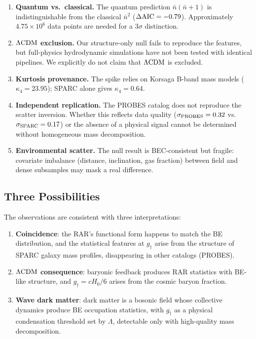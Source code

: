 \documentclass[twocolumn,twocolappendix]{aastex631}
\newcommand{\gdag}{g_{\dagger}}
\newcommand{\nbar}{\bar{n}}
\newcommand{\lcdm}{\Lambda{\rm CDM}}
\newcommand{\daic}{\Delta{\rm AIC}}
\begin{document}
\begin{enumerate}
    \item \textbf{Quantum vs.\ classical.} The quantum prediction
    $\nbar(\nbar+1)$ is indistinguishable from the classical $\nbar^2$
    ($\daic = -0.79$). Approximately $4.75 \times 10^6$ data points are
    needed for a $3\sigma$ distinction.
    \item \textbf{$\lcdm$ exclusion.} Our structure-only null fails to
    reproduce the features, but full-physics hydrodynamic simulations have
    not been tested with identical pipelines. We explicitly do not claim
    that $\lcdm$ is excluded.
    \item \textbf{Kurtosis provenance.} The spike relies on Korsaga B-band
    mass models ($\kappa_4 = 23.95$); SPARC alone gives $\kappa_4 = 0.64$.
    \item \textbf{Independent replication.} The PROBES catalog does not
    reproduce the scatter inversion. Whether this reflects data quality
    ($\sigma_{\rm PROBES} = 0.32$ vs.\ $\sigma_{\rm SPARC} = 0.17$) or
    the absence of a physical signal cannot be determined without
    homogeneous mass decomposition.
    \item \textbf{Environmental scatter.} The null result is BEC-consistent
    but fragile: covariate imbalance (distance, inclination, gas fraction)
    between field and dense subsamples may mask a real difference.
\end{enumerate}

\subsection{Three Possibilities}

The observations are consistent with three interpretations:
\begin{enumerate}
    \item[(a)] \textbf{Coincidence}: the RAR's functional form happens to
    match the BE distribution, and the statistical features at $\gdag$ arise
    from the structure of SPARC galaxy mass profiles, disappearing in other
    catalogs (PROBES).
    \item[(b)] \textbf{$\lcdm$ consequence}: baryonic feedback produces RAR
    statistics with BE-like structure, and $\gdag = cH_0/6$ arises from the
    cosmic baryon fraction.
    \item[(c)] \textbf{Wave dark matter}: dark matter is a bosonic field
    whose collective dynamics produce BE occupation statistics, with $\gdag$
    as a physical condensation threshold set by $\Lambda$, detectable only
    with high-quality mass decomposition.
\end{enumerate}
\end{document}
